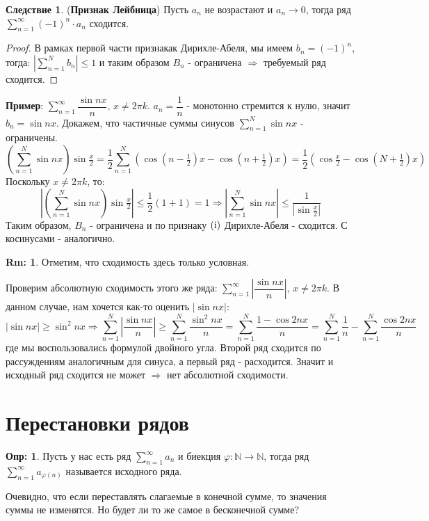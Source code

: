 \documentclass[12pt]{article}
\newcommand{\RN}[1]{%
	\textup{\uppercase\expandafter{\romannumeral#1}}%
}
\newcommand{\MN}{\mathbb{N}}
\theoremstyle{definition}
\newtheorem{defn}{Опр:}
\newtheorem{rem}{Rm:}
\newtheorem{corollary}{Следствие}
\begin{document}
\begin{corollary}(\textbf{Признак Лейбница})
	Пусть $a_n$ не возрастают и $a_n \to 0$, тогда ряд $\displaystyle \sum\limits_{n = 1}^{\infty}(-1)^n{\cdot}a_n$ сходится.
\end{corollary}
\begin{proof}
	В рамках первой части признакак Дирихле-Абеля, мы имеем $b_n = (-1)^n$, тогда: $\left|\displaystyle\sum\limits_{n = 1}^N b_n \right| \leq 1$ и таким образом $B_n$ - ограничена $\Rightarrow$ требуемый ряд сходится.
\end{proof}

\textbf{Пример}: $\displaystyle \sum\limits_{n = 1}^{\infty} \dfrac{\sin{nx}}{n}, \, x \neq 2\pi k$. $a_n = \dfrac{1}{n}$ - монотонно стремится к нулю, значит $b_n = \sin{nx}$. Докажем, что частичные суммы синусов $\displaystyle \sum\limits_{n = 1}^{N} \sin{nx}$ - ограничены.
$$
	\left(\sum\limits_{n = 1}^{N} \sin{nx}\right)\sin{\tfrac{x}{2}} = \dfrac{1}{2} \sum\limits_{n = 1}^{N} \left(\cos\left(n - \tfrac{1}{2}\right)x - \cos\left(n + \tfrac{1}{2}\right)x \right) = \dfrac{1}{2}\left(\cos{\tfrac{x}{2}} - \cos{\left(N + \tfrac{1}{2}\right)x}\right)
$$
Поскольку $x \neq 2 \pi k$, то: 
$$
	\displaystyle \left|\left(\sum\limits_{n = 1}^{N} \sin{nx}\right)\sin{\tfrac{x}{2}}\right| \leq \dfrac{1}{2}(1+ 1) = 1 \Rightarrow \left|\sum\limits_{n = 1}^{N} \sin{nx}\right| \leq \dfrac{1}{\left|\sin{\tfrac{x}{2}}\right|} 
$$ 
Таким образом, $B_n$ - ограничена и по признаку $(\RN{1})$ Дирихле-Абеля - сходится. С косинусами - аналогично.
\begin{rem}
	Отметим, что сходимость здесь только условная.
\end{rem}
Проверим абсолютную сходимость этого же ряда: $\displaystyle \sum\limits_{n = 1}^{\infty} \left|\dfrac{\sin{nx}}{n}\right|, \, x \neq 2\pi k$. В данном случае, нам хочется как-то оценить $|\sin{nx}|$:
$$
	|\sin{nx}| \geq \sin^2{nx} \Rightarrow \sum\limits_{n = 1}^{N} \left|\dfrac{\sin{nx}}{n}\right| \geq \sum\limits_{n = 1}^{N}\dfrac{\sin^2{nx}}{n} = \sum\limits_{n = 1}^{N}\dfrac{1 - \cos{2nx}}{n} = \sum\limits_{n = 1}^{N}\dfrac{1}{n} - \sum\limits_{n = 1}^{N}\dfrac{\cos{2nx}}{n}
$$
где мы воспользовались формулой двойного угла. Второй ряд сходится по рассуждениям аналогичным для синуса, а первый ряд - расходится. Значит и исходный ряд сходится не может $\Rightarrow$ нет абсолютной сходимости.

\newpage
\section*{Перестановки рядов}
\begin{defn}
	Пусть у нас есть ряд $\displaystyle \sum\limits_{n = 1 }^{\infty} a_n$ и биекция $\varphi \colon \MN \to \MN$, тогда ряд $\displaystyle \sum\limits_{n = 1 }^{\infty} a_{\varphi(n)}$ называется  исходного ряда.
\end{defn}
Очевидно, что если переставлять слагаемые в конечной сумме, то значения суммы не изменятся. Но будет ли то же самое в бесконечной сумме? 
\end{document}
